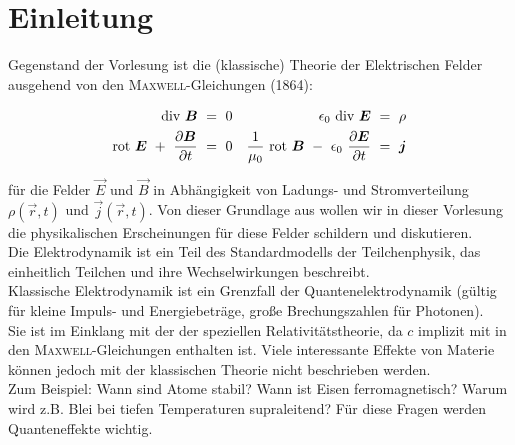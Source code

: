 \chapter{Einleitung}
Gegenstand der Vorlesung ist die (klassische) Theorie der Elektrischen Felder ausgehend von den \textsc{Maxwell}-Gleichungen (1864):

\begin{align*}
\div \vec{B} \ &= \ 0    &\epsilon_0 \ \div \vec{E} \ &= \ \rho\\
\rot \vec{E} \ + \ \pdiff{\vec{B}}{t} \ &= \ 0   &\frac{1}{\mu_0} \ \rot \vec{B} \ - \ \epsilon_0 \ \pdiff{\vec{E}}{t} \ &= \ \vec{j}
\end{align*}

für die Felder $\vec{E}$ und $\vec{B}$ in Abhängigkeit von Ladungs- und Stromverteilung $\rho(\vec{r},t)$ und $\vec{j}(\vec{r},t)$. Von dieser Grundlage aus wollen wir in dieser Vorlesung die physikalischen Erscheinungen für diese Felder schildern und diskutieren.\\
Die Elektrodynamik ist ein Teil des Standardmodells der Teilchenphysik, das einheitlich Teilchen und ihre Wechselwirkungen beschreibt.\\
Klassische Elektrodynamik ist ein Grenzfall der Quantenelektrodynamik (gültig für kleine Impuls- und Energiebeträge, große Brechungszahlen für Photonen).\\
Sie ist im Einklang mit der der speziellen Relativitätstheorie, da $c$ implizit mit in den \textsc{Maxwell}-Gleichungen enthalten ist. Viele interessante Effekte von Materie können jedoch mit der klassischen Theorie nicht beschrieben werden.\\
Zum Beispiel: Wann sind Atome stabil? Wann ist Eisen ferromagnetisch? Warum wird z.B. Blei bei tiefen Temperaturen supraleitend? Für diese Fragen werden Quanteneffekte wichtig.